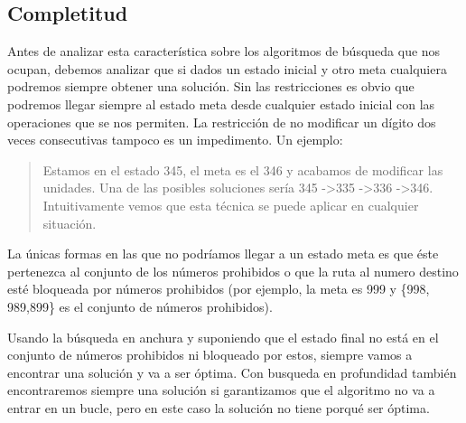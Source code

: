 \documentclass[12pt]{article}
\begin{document}
\subsection{Completitud}
Antes de analizar esta característica sobre los algoritmos de búsqueda que nos ocupan, debemos analizar que si dados un estado inicial y otro meta cualquiera podremos siempre obtener una solución. Sin las restricciones es obvio que podremos llegar siempre al estado meta desde cualquier estado inicial con las operaciones que se nos permiten. La restricción de no modificar un dígito dos veces consecutivas tampoco es un impedimento. Un ejemplo: 
	\begin{quote} Estamos en el estado 345, el meta es el 346 y acabamos de modificar las unidades. Una de las posibles soluciones sería 345 -\textgreater  335 -\textgreater  336 -\textgreater  346. Intuitivamente vemos que esta técnica se puede aplicar en cualquier situación.
	\end{quote}
La únicas formas en las que no podríamos llegar a un estado meta es que éste pertenezca al conjunto de los números prohibidos o que la ruta al numero destino esté bloqueada por números prohibidos (por ejemplo, la meta es 999 y \{998, 989,899\} es el conjunto de números prohibidos).

Usando la búsqueda en anchura y suponiendo que el estado final no está en el conjunto de números prohibidos ni bloqueado por estos, siempre vamos a encontrar una solución y va a ser óptima. Con busqueda en profundidad también encontraremos siempre una solución si garantizamos que el algoritmo no va a entrar en un bucle, pero en este caso la solución no tiene porqué ser óptima.
\end{document}
